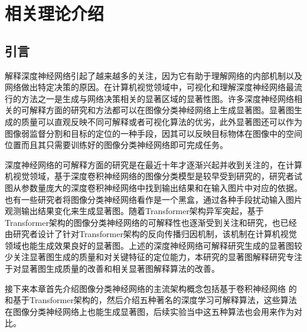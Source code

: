 


\chapter{相关理论介绍
}
\thispagestyle{others}
\pagestyle{others}
\xiaosi

\section{引言}
解释深度神经网络引起了越来越多的关注，因为它有助于理解网络的内部机制以及网络做出特定决策的原因。在计算机视觉领域中，可视化和理解深度神经网络最流行的方法之一是生成与网络决策相关的显著区域的显著性图。许多深度神经网络相关的可解释方面的研究和方法都可以在图像分类神经网络上生成显著图。显著图生成的质量可以直观反映不同可解释或者可视化算法的优劣，此外显著图还可以作为图像弱监督分割和目标的定位的一种手段，因其可以反映目标物体在图像中的空间位置而且其只需要训练好的图像分类神经网络即可完成任务。


深度神经网络的可解释方面的研究是在最近十年才逐渐兴起并收到关注的，在计算机视觉领域，基于深度卷积神经网络的图像分类模型是较早受到研究的，研究者试图从参数量庞大的深度卷积神经网络中找到输出结果和在输入图片中对应的依据。也有一些研究者将图像分类神经网络看作是一个黑盒，通过各种手段扰动输入图片观测输出结果变化来生成显著图。随着Transformer架构异军突起，基于Transformer架构的图像分类神经网络的可解释性也逐渐受到关注和研究，也已经由研究者设计了针对Transformer架构的反向传播归因机制，该机制在计算机视觉领域也能生成效果良好的显著图。上述的深度神经网络可解释研究生成的显著图较少关注显著图生成的质量和对关键特征的定位能力，本研究的显著图解释研究专注于对显著图生成质量的改善和相关显著图解释算法的改善。

接下来本章首先介绍图像分类神经网络的主流架构概念包括基于卷积神经网络 的和基于Transformer架构的，然后介绍五种著名的深度学习可解释算法，这些算法在图像分类神经网络上也能生成显著图，后续实验当中这五种算法也会用来作为对比。

